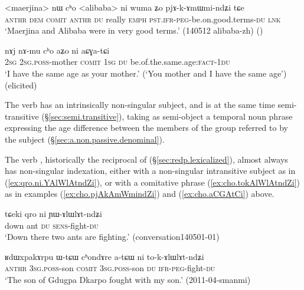 \begin{exe}
\ex   \label{ex:cho.pjAkAmWmindZi}
 \gll  <maerjina> nɯ cʰo <alibaba> ni wuma ʑo pjɤ-k-ɤmɯmi-ndʑi tɕe \\
\textsc{anthr} \textsc{dem} \textsc{comit}  \textsc{anthr} \textsc{du} really \textsc{emph} \textsc{pst}.\textsc{ifr}-\textsc{peg}-be.on.good.terms-\textsc{du} \textsc{lnk} \\
\glt `Maerjina and Alibaba were in very good terms.' (140512 alibaba-zh)
()
\end{exe}

\begin{exe}
\ex   \label{ex:cho.aCGAtCi}
 \gll  nɤj nɤ-mu cʰo aʑo ni aɕɣa-tɕi \\
 \textsc{2sg} \textsc{2sg}.\textsc{poss}-mother \textsc{comit} \textsc{1sg} \textsc{du} be.of.the.same.age:\textsc{fact}-\textsc{1du} \\
 \glt `I have the same age as your mother.' (`You mother and I have the same age') (elicited)
\end{exe} 

The verb  has an intrinsically non-singular subject, and is at the same time semi-transitive (§\ref{sec:semi.transitive}), taking as semi-object a temporal noun phrase expressing the age difference between the members of the group referred to by the subject (§\ref{sec:a.non.passive.denominal}).
 
The verb , historically the reciprocal of  (§\ref{sec:redp.lexicalized}), almost always has non-singular indexation, either with a non-singular intransitive subject as in (\ref{ex:qro.ni.YAlWlAtndZi}), or with a comitative phrase (\ref{ex:cho.tokAlWlAtndZi}) as in examples (\ref{ex:cho.pjAkAmWmindZi}) and (\ref{ex:cho.aCGAtCi}) above.

\begin{exe}
\ex   \label{ex:qro.ni.YAlWlAtndZi}
 \gll  tɕeki qro ni ɲɯ-ɤlɯlɤt-ndʑi \\
 down ant \textsc{du} \textsc{sens}-fight-\textsc{du} \\
\glt `Down there two ants are fighting.' (conversation140501-01)
\end{exe}

\begin{exe}
	\ex   \label{ex:cho.tokAlWlAtndZi}
	\gll ʁdɯxpakɤrpu ɯ-tɕɯ cʰondɤre a-tɕɯ ni to-k-ɤlɯlɤt-ndʑi \\
	\textsc{anthr} \textsc{3sg}.\textsc{poss}-son \textsc{comit}  \textsc{3sg}.\textsc{poss}-son \textsc{du} \textsc{ifr}-\textsc{peg}-fight-\textsc{du} \\
	\glt `The son of Gdugpa Dkarpo fought with my son.' (2011-04-smanmi)
\end{exe}


